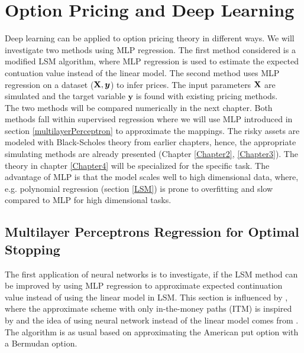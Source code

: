 
\chapter{Option Pricing and Deep Learning} %

\label{Chapter5} %

Deep learning can be applied to option pricing theory in different ways. We will investigate two methods using MLP regression. The first method considered is a modified LSM algorithm, where MLP regression is used to estimate the expected contuation value instead of the linear model. The second method uses MLP regression on a dataset ($\mathbf{X}, \bm{y}$) to infer prices. The input parameters $\mathbf{X}$ are simulated and the target variable $\bm{y}$ is found with existing pricing methods.\\

The two methods will be compared numerically in the next chapter. Both methods fall within supervised regression where we will use MLP introduced in section \ref{multilayerPerceptron} to approximate the mappings. The risky assets are modeled with Black-Scholes theory from earlier chapters, hence, the appropriate simulating methods are already presented (Chapter \ref{Chapter2}, \ref{Chapter3}). The theory in chapter \ref{Chapter4} will be specialized for the specific task. The advantage of MLP is that the model scales well to high dimensional data, where, e.g. polynomial regression (section \ref{LSM}) is prone to overfitting and slow compared to MLP for high dimensional tasks. 

\section{Multilayer Perceptrons Regression for Optimal Stopping}
The first application of neural networks is to investigate, if the LSM method can be improved by using MLP regression to approximate expected continuation value instead of using the linear model in LSM. This section is influenced by \parencite{LSM, Lelong19, KohlerMichael2010}, where the approximate scheme with only in-the-money paths (ITM) is inspired by \parencite{LSM} and the idea of using neural network instead of the linear model comes from \parencite{KohlerMichael2010, Lelong19}. The algorithm is as usual based on approximating the American put option with a Bermudan option. \\

